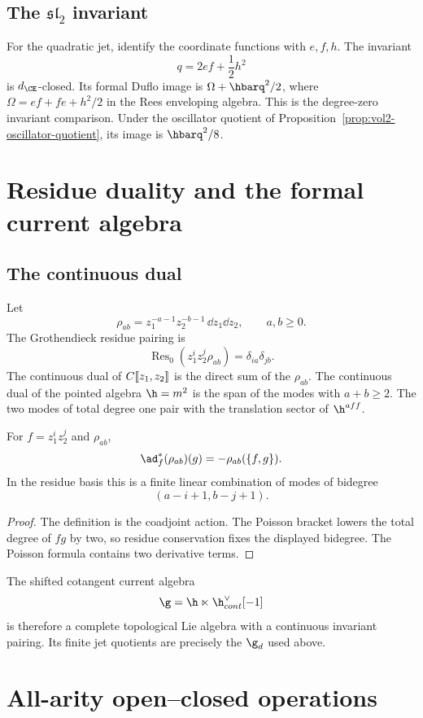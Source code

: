 \section{The \texorpdfstring{$\mathfrak{sl}_2$}{sl2} invariant}
For the quadratic jet, identify the coordinate functions with $e,f,h$.  The invariant
\[
 q=2ef+\frac12h^2
\]
is $d_{\CE}$-closed.  Its formal Duflo image is $\Omega+\hbarq^2/2$, where $\Omega=ef+fe+h^2/2$ in the Rees enveloping algebra.  This is the degree-zero invariant comparison.  Under the oscillator quotient of Proposition~\ref{prop:vol2-oscillator-quotient}, its image is $\hbarq^2/8$.

\chapter{Residue duality and the formal current algebra}
\section{The continuous dual}
Let
\[
 \rho_{ab}=z_1^{-a-1}z_2^{-b-1}\,\dd z_1\dd z_2,
 \qquad a,b\ge0.
\]
The Grothendieck residue pairing is
\[
 \operatorname{Res}_0\left(z_1^iz_2^j\rho_{ab}\right)
 =\delta_{ia}\delta_{jb}.
\]
The continuous dual of $C\llbracket z_1,z_2\rrbracket$ is the direct sum of the $\rho_{ab}$.  The continuous dual of the pointed algebra $\h=\mathfrak m^2$ is the span of the modes with $a+b\ge2$.  The two modes of total degree one pair with the translation sector of $\h^{\mathrm{aff}}$.

\begin{proposition}
For $f=z_1^iz_2^j$ and $\rho_{ab}$,
\[
 \ad_f^*(\rho_{ab})(g)
 =-\rho_{ab}(\{f,g\}).
\]
In the residue basis this is a finite linear combination of modes of bidegree
\[
 (a-i+1,b-j+1).
\]
\end{proposition}
\begin{proof}
The definition is the coadjoint action.  The Poisson bracket lowers the total degree of $fg$ by two, so residue conservation fixes the displayed bidegree.  The Poisson formula contains two derivative terms.
\end{proof}

The shifted cotangent current algebra
\[
 \g=\h\ltimes\h^\vee_{\mathrm{cont}}[-1]
\]
is therefore a complete topological Lie algebra with a continuous invariant pairing.  Its finite jet quotients are precisely the $\g_d$ used above.

\chapter{All-arity open--closed operations}
